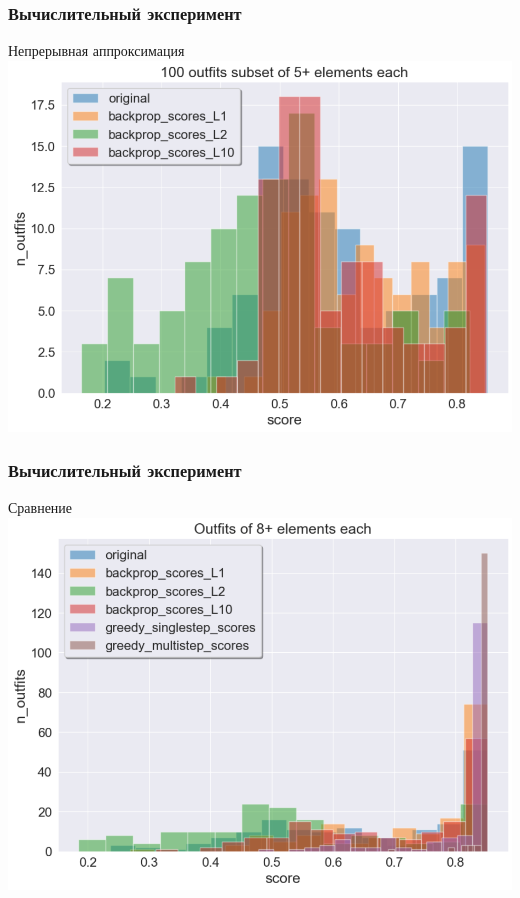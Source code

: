 \documentclass[10pt]{beamer}
\begin{document}
\begin{frame}
	\frametitle{Вычислительный эксперимент}
	\begin{block}{Непрерывная аппроксимация}
		\includegraphics[scale = 0.52]{../figures/backprop_at_least_5_subset100.png}
	\end{block}
\end{frame}

\begin{frame}
	\frametitle{Вычислительный эксперимент}
	\begin{block}{Сравнение}
		\includegraphics[scale = 0.52]{../figures/greedy_and_backprop_at_least_8.png}
	\end{block}
\end{frame}
\end{document}
